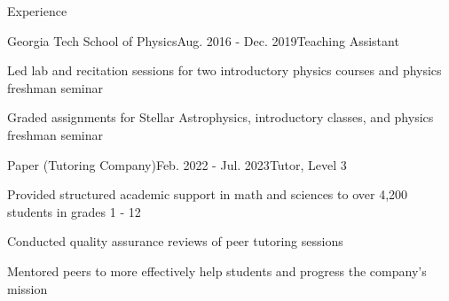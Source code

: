 \documentclass{resume} %
\begin{document}
\begin{rSection}{Experience}

  \begin{rSubsection}{Georgia Tech School of Physics}{Aug. 2016 - Dec. 2019}{Teaching Assistant}{}
  \item Led lab and recitation sessions for two introductory physics courses and physics freshman seminar
  \item Graded assignments for Stellar Astrophysics, introductory classes, and physics freshman seminar
  \end{rSubsection}

  \begin{rSubsection}{Paper (Tutoring Company)}{Feb. 2022 - Jul. 2023}{Tutor, Level 3}{}
  \item Provided structured academic support in math and sciences to over 4,200 students in grades 1 - 12
  \item Conducted quality assurance reviews of peer tutoring sessions
  \item Mentored peers to more effectively help students and progress the company's mission
  \end{rSubsection}




\end{rSection}
\end{document}
